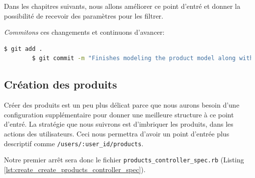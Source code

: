 \documentclass[]{report}
\begin{document}
      Dans les chapitres suivants, nous allons améliorer ce point d'entré et donner la possibilité de recevoir des paramètres pour les filtrer.

      \textit{Commitons} ces changements et continuons d'avancer:

      \begin{scriptsize}
        \begin{lstlisting}[language=bash]
        $ git add .
        $ git commit -m "Finishes modeling the product model along with user associations"
        \end{lstlisting}
      \end{scriptsize}

    \subsection{Création des produits}\label{subsec:create_products}

      Créer des produits est un peu plus délicat parce que nous aurons besoin d'une configuration supplémentaire pour donner une meilleure structure à ce point d'entré. La stratégie que nous suivrons est d'imbriquer les produits, dans les actions des utilisateurs. Ceci nous permettra d'avoir  un point d'entrée plus descriptif comme \verb|/users/:user_id/products|.

      Notre premier arrêt sera donc le fichier \verb|products_controller_spec.rb| (Listing \ref{lst:create_create_products_controller_spec}).
\end{document}
